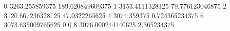 0 3263.255859375 189.620849609375
1 3153.4111328125 79.776123046875
2 3120.667236328125 47.0322265625
4 3074.359375 0.724365234375
6 3073.635009765625 0.0
8 3076.000244140625 2.365234375
